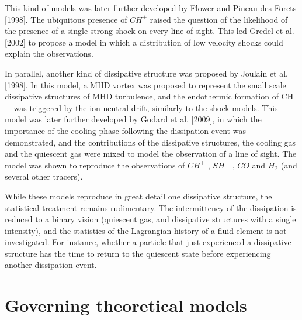 This kind of models was later further developed by Flower and Pineau des
Forets [1998]. The ubiquitous presence of $CH^+$ raised the question of the
likelihood of the presence of a single strong shock on every line of sight. This
led Gredel et al. [2002] to propose a model in which a distribution of low
velocity shocks could explain the observations.

In parallel, another kind of dissipative structure was proposed by Joulain
et al. [1998]. In this model, a MHD vortex was proposed to represent the
small scale dissipative structures of MHD turbulence, and the endothermic
formation of CH + was triggered by the ion-neutral drift, similarly to the
shock models. This model was later further developed by Godard et al. [2009],
in which the importance of the cooling phase following the dissipation event
was demonstrated, and the contributions of the dissipative structures, the
cooling gas and the quiescent gas were mixed to model the observation of a
line of sight. The model was shown to reproduce the observations of $CH^+$ ,
$SH^+$ , $CO$ and $H_2$ (and several other tracers).

While these models reproduce in great detail one dissipative structure, the
statistical treatment remains rudimentary. The intermittency of the dissipation is reduced to a binary vision (quiescent gas, and dissipative structures with a single intensity), and the statistics of the Lagrangian history of a fluid
element is not investigated. For instance, whether a particle that just experienced
a dissipative structure has the time to return to the quiescent state before
experiencing another dissipation event.


\section{Governing theoretical models}
